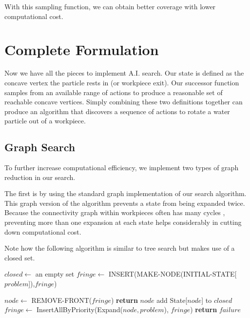With this sampling function, we can obtain better coverage with lower computational cost.

	\section{Complete Formulation}

Now we have all the pieces to implement A.I. search. Our state is defined as the concave vertex the particle rests in (or workpiece exit). Our successor function samples from an available range of actions to produce a reasonable set of reachable concave vertices. Simply combining these two definitions together can produce an algorithm that discovers a sequence of actions to rotate a water particle out of a workpiece.

	\subsection{Graph Search}

To further increase computational efficiency, we implement two types of graph reduction in our search.

The first is by using the standard graph implementation of our search algorithm. This graph version of the algorithm prevents a state from being expanded twice. Because the connectivity graph within workpieces often has many cycles \cite{Yasui2011}, preventing more than one expansion at each state helps considerably in cutting down computational cost.

Note how the following algorithm is similar to tree search but makes use of a closed set.

\begin{algorithm}[H]
\begin{algorithmic}[1]
	\State $closed \gets$ an empty set
	\State $fringe \gets$ INSERT(MAKE-NODE(INITIAL-STATE[$problem$]),$fringe$)

		\State $node \gets$ REMOVE-FRONT($fringe$)
			\State \textbf{return} $node$ 
		\EndIf
			\State add State[$node$] to $closed$
			\State $fringe \gets$ InsertAllByPriority(Expand($node, problem$), $fringe$)
		\EndIf
	\EndWhile
	\State \textbf{return} $failure$ 

\EndFunction

\end{algorithmic}
\end{algorithm}

